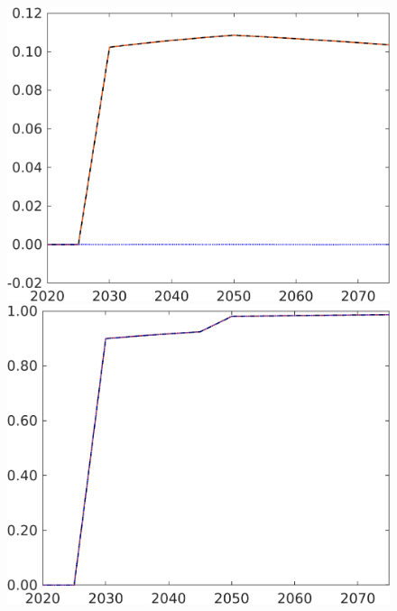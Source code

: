 \begin{figure}[h!!]
\begin{minipage}[]{0.32\textwidth}
	\end{minipage}
%	
	\begin{minipage}[]{0.32\textwidth}
		\includegraphics[width=1\textwidth]{../../codding_model/own_basedOnFried/optimalPol_190722_tidiedUp/figures/all_July22/taul_CompEffOPT_T_NoTaus_pol4_spillover0_noskill1_sep1_xgrowth1_etaa0.79_lgd0_lff0.png}
	\end{minipage}
	\begin{minipage}[]{0.32\textwidth}
		\includegraphics[width=1\textwidth]{../../codding_model/own_basedOnFried/optimalPol_190722_tidiedUp/figures/all_July22/tauf_CompEffOPT_T_NoTaus_pol4_spillover0_noskill1_sep1_xgrowth1_etaa0.79_lgd0_lff0.png}

\end{minipage}
\end{figure}
